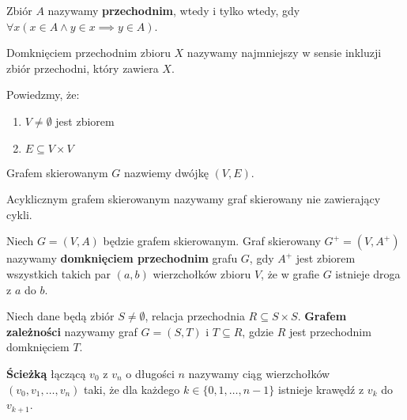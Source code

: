 \begin{definicja}\label{def:transitive_set}
Zbiór \(A\) nazywamy \textbf{przechodnim}, wtedy i tylko wtedy, gdy
\(\forall{x}\left(x\in A \land y\in x\implies y\in A\right)\).  
\end{definicja}

\begin{definicja}\label{def:transitive_closure_set}
Domknięciem przechodnim zbioru \(X\) nazywamy najmniejszy w sensie inkluzji zbiór przechodni, który zawiera \(X\).
\end{definicja}

\begin{definicja}\label{def:DG}
Powiedzmy, że:
\begin{enumerate}
\item \(V\neq\emptyset\) jest zbiorem
\item \( E \subseteq V \times V \)
\end{enumerate}
Grafem skierowanym \(G\) nazwiemy dwójkę \((V, E)\).
\end{definicja}

\begin{definicja}\label{def:dag}
Acyklicznym grafem skierowanym nazywamy graf skierowany nie zawierający cykli.
\end{definicja}

\begin{definicja}\label{def:domk_przechodnie_grafu}
Niech \(G=(V,A)\) będzie grafem skierowanym. Graf skierowany \(G^+=(V,A^{+})\) nazywamy \textbf{domknięciem przechodnim} grafu \(G\), gdy \(A^{+}\) jest zbiorem wszystkich takich par \((a,b)\) wierzchołków zbioru \(V\), że w grafie \(G\) istnieje droga z \(a\) do \(b\).
\end{definicja}

\begin{definicja}\label{def:depend_graph}
Niech dane będą zbiór \(S\neq\emptyset\), relacja przechodnia \(R\subseteq S\times S\). \textbf{Grafem zależności} nazywamy graf \(G=(S,T)\) i \(T\subseteq R\), gdzie \(R\) jest przechodnim domknięciem \(T\).
\end{definicja}


\begin{definicja}[Ścieżka]\label{def:sciezka}
\textbf{Ścieżką} łączącą \(v_0\) z \(v_n\) o długości \(n\) nazywamy ciąg wierzchołków \((v_0, v_1, \dots, v_n)\) taki, że dla każdego \(k\in \{0, 1, \dots, n-1\}\) istnieje krawędź z \(v_k\) do \(v_{k+1}\).
\end{definicja}

